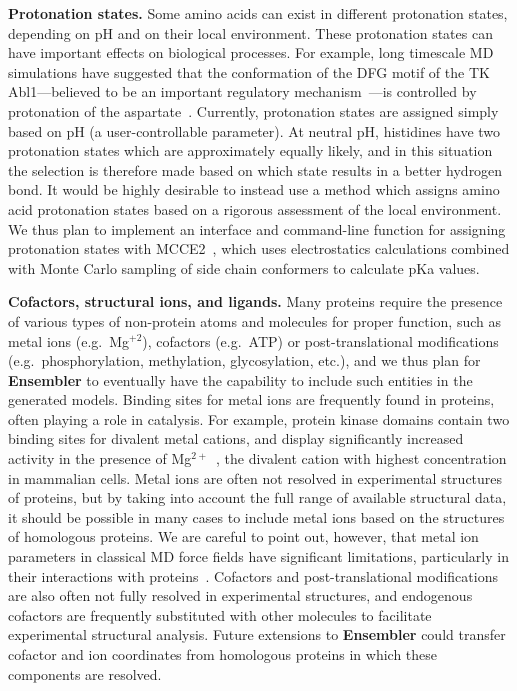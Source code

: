 \documentclass[aps,prl,preprint,nofootinbib,superscriptaddress,linenumbers]{revtex4-1}
\begin{document}
{\bf Protonation states.}
Some amino acids can exist in different protonation states, depending on pH and on their local environment.
These protonation states can have important effects on biological processes.
For example, long timescale MD simulations have suggested that the conformation of the DFG motif of the TK Abl1---believed to be an important regulatory mechanism~\cite{nagar:cell:2003:abl-1opl}---is controlled by protonation of the aspartate~\cite{shan:pnas:2009:abl}.
Currently, protonation states are assigned simply based on pH (a user-controllable parameter).
At neutral pH, histidines have two protonation states which are approximately equally likely, and in this situation the selection is therefore made based on which state results in a better hydrogen bond.
It would be highly desirable to instead use a method which assigns amino acid protonation states based on a rigorous assessment of the local environment.
We thus plan to implement an interface and command-line function for assigning protonation states with MCCE2~\cite{alexov-gunner:biophys-j:1997:mcce2,georgescu-alexov-gunner:biophys-j:2002:mcce2,song-mao-gunner:j-comput-chem:2009:mcce2}, which uses electrostatics calculations combined with Monte Carlo sampling of side chain conformers to calculate pKa values.

{\bf Cofactors, structural ions, and ligands.}
Many proteins require the presence of various types of non-protein atoms and molecules for proper function, such as metal ions (e.g.~Mg$^{+2}$), cofactors (e.g.~ATP) or post-translational modifications (e.g.~phosphorylation, methylation, glycosylation, etc.), and we thus plan for {\bf Ensembler} to eventually have the capability to include such entities in the generated models.
Binding sites for metal ions are frequently found in proteins, often playing a role in catalysis.
For example, protein kinase domains contain two binding sites for divalent metal cations, and display significantly increased activity in the presence of Mg$^{2+}$~\cite{adams:prot-sci:1993:kinase-metal-ions}, the divalent cation with highest concentration in mammalian cells.
Metal ions are often not resolved in experimental structures of proteins, but by taking into account the full range of available structural data, it should be possible in many cases to include metal ions based on the structures of homologous proteins.
We are careful to point out, however, that metal ion parameters in classical MD force fields have significant limitations, particularly in their interactions with proteins~\cite{sousa:book:2010:metal-ion-parameters-difficulties}.
Cofactors and post-translational modifications are also often not fully resolved in experimental structures, and endogenous cofactors are frequently substituted with other molecules to facilitate experimental structural analysis.
Future extensions to {\bf Ensembler} could transfer cofactor and ion coordinates from homologous proteins in which these components are resolved.
\end{document}
